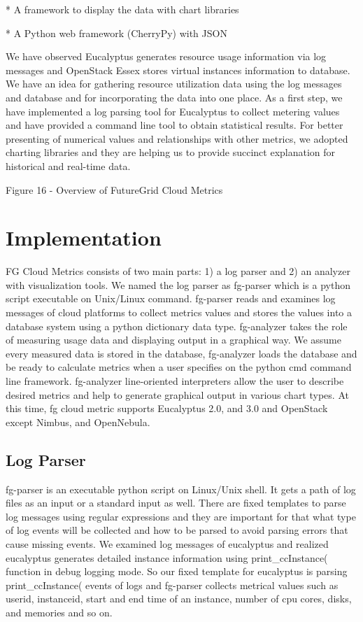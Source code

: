 \documentclass{sig-alternate}
\begin{document}
* A framework to display the data with chart libraries

* A Python web framework (CherryPy) with JSON

We have observed Eucalyptus generates resource usage information via log messages and OpenStack Essex stores virtual instances information to database. We have an idea for gathering resource utilization data using the log messages and database and for incorporating the data into one place. As a first step, we have implemented a log parsing tool for Eucalyptus to collect metering values and have provided a command line tool to obtain statistical results. For better presenting of numerical values and relationships with other metrics, we adopted charting libraries and they are helping us to provide succinct explanation for historical and real-time data.

Figure 16 - Overview of FutureGrid Cloud Metrics

\section{Implementation} \label{S:implementation}

FG Cloud Metrics consists of two main parts: 1) a log parser and 2) an analyzer with visualization tools. We named the log parser as fg-parser which is a python script executable on Unix/Linux command. fg-parser reads and examines log messages of cloud platforms to collect metrics values and stores the values into a database system using a python dictionary data type. fg-analyzer takes the role of measuring usage data and displaying output in a graphical way. We assume every measured data is stored in the database, fg-analyzer loads the database and be ready to calculate metrics when a user specifies on the python cmd command line framework. fg-analyzer line-oriented interpreters allow the user to describe desired metrics and help to generate graphical output in various chart types. At this time, fg cloud metric supports Eucalyptus 2.0, and 3.0 and OpenStack except Nimbus, and OpenNebula.

\subsection{Log Parser}

fg-parser is an executable python script on Linux/Unix shell. It gets a path of log files as an input or a standard input as well. There are fixed templates to parse log messages using regular expressions and they are important for that what type of log events will be collected and how to be parsed to avoid parsing errors that cause missing events. We examined log messages of eucalyptus and realized eucalyptus generates detailed instance information using print\_ccInstance( function in debug logging mode. So our fixed template for eucalyptus is parsing print\_ccInstance( events of logs and fg-parser collects metrical values such as userid, instanceid, start and end time of an instance, number of cpu cores, disks, and memories and so on.
\end{document}
